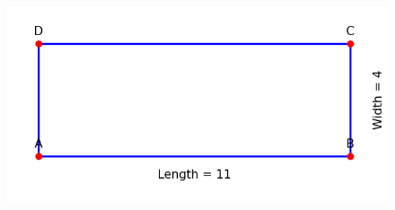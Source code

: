 \documentclass[journal]{IEEEtran}
\begin{document}
\begin{figure}[H]
\begin{center}
\includegraphics[width=0.7\columnwidth]{figs/fig.png}
\end{center}
\label{fig:Fig1}
\end{figure}
\end{document}
